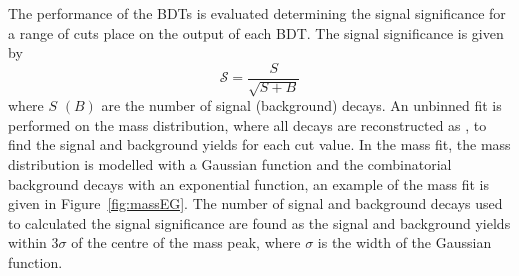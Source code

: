 The performance of the BDTs is evaluated determining the signal significance for a range of cuts place on the output of each BDT. The signal significance is given by
\begin{equation}
\mathcal{S} = \frac{S}{\sqrt{S+B}}
\label{eq:SigSigf}
\end{equation}
where $S$ $(B)$ are the number of signal (background) decays.
An unbinned \ml fit is performed on the \bhh mass distribution, where all \bhh decays are reconstructed as \bsmumu, to find the signal and background yields for each cut value. %
In the mass fit, the \bhh mass distribution is modelled with a Gaussian function and the combinatorial background decays with an exponential function, an example of the mass fit is given in Figure~\ref{fig:massEG}. 
The number of signal and background decays used to calculated the signal significance are found as the signal and background yields within 3$\sigma$ of the centre of the \bhh mass peak, where $\sigma$ is the width of the Gaussian function.


